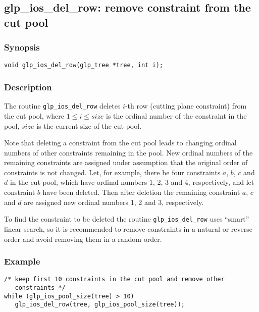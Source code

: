\subsection{glp\_ios\_del\_row: remove constraint from the cut pool}

\subsubsection*{Synopsis}

\begin{verbatim}
void glp_ios_del_row(glp_tree *tree, int i);
\end{verbatim}

\subsubsection*{Description}

The routine \verb|glp_ios_del_row| deletes $i$-th row (cutting plane
constraint) from the cut pool, where $1\leq i\leq size$ is the ordinal
number of the constraint in the pool, $size$ is the current size of the
cut pool.

Note that deleting a constraint from the cut pool leads to changing
ordinal numbers of other constraints remaining in the pool. New ordinal
numbers of the remaining constraints are assigned under assumption that
the original order of constraints is not changed. Let, for example,
there be four constraints $a$, $b$, $c$ and $d$ in the cut pool, which
have ordinal numbers 1, 2, 3 and 4, respectively, and let constraint
$b$ have been deleted. Then after deletion the remaining constraint $a$,
$c$ and $d$ are assigned new ordinal numbers 1, 2 and 3, respectively.

To find the constraint to be deleted the routine \verb|glp_ios_del_row|
uses ``smart'' linear search, so it is recommended to remove constraints
in a natural or reverse order and avoid removing them in a random order.

\subsubsection*{Example}

\begin{verbatim}
/* keep first 10 constraints in the cut pool and remove other
   constraints */
while (glp_ios_pool_size(tree) > 10)
   glp_ios_del_row(tree, glp_ios_pool_size(tree));
\end{verbatim}

\newpage


